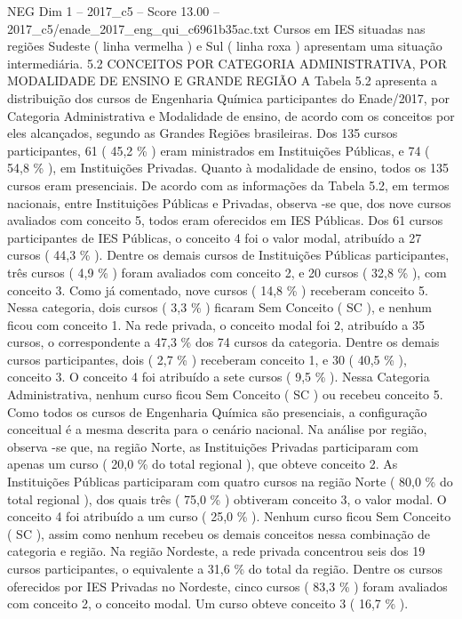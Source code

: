 \begin{textsample}{NEG Dim 1 – 2017\_c5 – Score 13.00 – 2017\_c5/enade\_2017\_eng\_qui\_c6961b35ac.txt}
Cursos em IES situadas nas regiões Sudeste ( linha vermelha ) e Sul ( linha roxa ) apresentam uma situação intermediária. 5.2 CONCEITOS POR CATEGORIA ADMINISTRATIVA, POR MODALIDADE DE ENSINO E GRANDE REGIÃO A Tabela 5.2 apresenta a distribuição dos cursos de Engenharia Química participantes do Enade/2017, por Categoria Administrativa e Modalidade de ensino, de acordo com os conceitos por eles alcançados, segundo as Grandes Regiões brasileiras.
Dos 135 cursos participantes, 61 ( 45,2 \% ) eram ministrados em Instituições Públicas, e 74 ( 54,8 \% ), em Instituições Privadas.
Quanto à modalidade de ensino, todos os 135 cursos eram presenciais.
De acordo com as informações da Tabela 5.2, em termos nacionais, entre Instituições Públicas e Privadas, observa -se que, dos nove cursos avaliados com conceito 5, todos eram oferecidos em IES Públicas.
Dos 61 cursos participantes de IES Públicas, o conceito 4 foi o valor modal, atribuído a 27 cursos ( 44,3 \% ).
Dentre os demais cursos de Instituições Públicas participantes, três cursos ( 4,9 \% ) foram avaliados com conceito 2, e 20 cursos ( 32,8 \% ), com conceito 3.
Como já comentado, nove cursos ( 14,8 \% ) receberam conceito 5.
Nessa categoria, dois cursos ( 3,3 \% ) ficaram Sem Conceito ( SC ), e nenhum ficou com conceito 1.
Na rede privada, o conceito modal foi 2, atribuído a 35 cursos, o correspondente a 47,3 \% dos 74 cursos da categoria.
Dentre os demais cursos participantes, dois ( 2,7 \% ) receberam conceito 1, e 30 ( 40,5 \% ), conceito 3.
O conceito 4 foi atribuído a sete cursos ( 9,5 \% ).
Nessa Categoria Administrativa, nenhum curso ficou Sem Conceito ( SC ) ou recebeu conceito 5.
Como todos os cursos de Engenharia Química são presenciais, a configuração conceitual é a mesma descrita para o cenário nacional.
Na análise por região, observa -se que, na região Norte, as Instituições Privadas participaram com apenas um curso ( 20,0 \% do total regional ), que obteve conceito 2.
As Instituições Públicas participaram com quatro cursos na região Norte ( 80,0 \% do total regional ), dos quais três ( 75,0 \% ) obtiveram conceito 3, o valor modal.
O conceito 4 foi atribuído a um curso ( 25,0 \% ).
Nenhum curso ficou Sem Conceito ( SC ), assim como nenhum recebeu os demais conceitos nessa combinação de categoria e região.
Na região Nordeste, a rede privada concentrou seis dos 19 cursos participantes, o equivalente a 31,6 \% do total da região.
Dentre os cursos oferecidos por IES Privadas no Nordeste, cinco cursos ( 83,3 \% ) foram avaliados com conceito 2, o conceito modal.
Um curso obteve conceito 3 ( 16,7 \% ).

\end{textsample}
